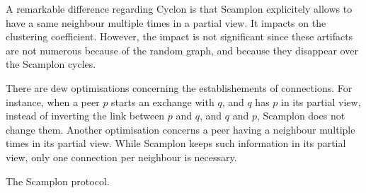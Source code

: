 A remarkable difference regarding Cyclon is that Scamplon explicitely allows to
have a same neighbour multiple times in a partial view. It impacts on the
clustering coefficient. However, the impact is not significant since these
artifacts are not numerous because of the random graph, and because they
disappear over the Scamplon cycles.

There are dew optimisations concerning the establishements of connections. For
instance, when a peer $p$ starts an exchange with $q$, and $q$ has $p$ in its
partial view, instead of inverting the link between $p$ and $q$, and $q$ and
$p$, Scamplon does not change them. Another optimisation concerns a peer having
a neighbour multiple times in its partial view. While Scamplon keeps such
information in its partial view, only one connection per neighbour is
necessary.

\begin{algorithm}
  
  \caption{\label{algo:scamplon}The Scamplon protocol.}
\end{algorithm}

